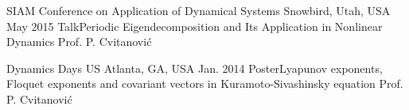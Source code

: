 


\begin{cventries}


\cvconference
{SIAM Conference on Application of Dynamical Systems}
{Snowbird, Utah, USA} 
{May 2015}
{Talk}{Periodic Eigendecomposition and Its Application in Nonlinear Dynamics} 
{Prof. P. Cvitanović}


\cvconference
{Dynamics Days US}
{Atlanta, GA, USA }
{Jan. 2014}
{Poster}{Lyapunov exponents, Floquet exponents and covariant vectors in 
Kuramoto-Sivashinsky equation}
{Prof. P. Cvitanović }


\end{cventries}